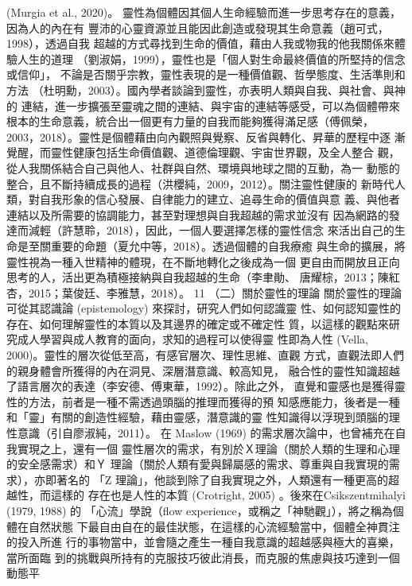 (Murgia et al., 2020)。 
靈性為個體因其個人生命經驗而進一步思考存在的意義，因為人的內在有
豐沛的心靈資源並且能因此創造或發現其生命意義（趙可式，1998），透過自我
超越的方式尋找到生命的價值，藉由人我或物我的他我關係來體驗人生的道理
（劉淑娟，1999），靈性也是「個人對生命最終價值的所堅持的信念或信仰」，
不論是否關乎宗教，靈性表現的是一種價值觀、哲學態度、生活準則和方法
（杜明勳，2003）。國內學者談論到靈性，亦表明人類與自我、與社會、與神的
連結，進一步擴張至靈魂之間的連結、與宇宙的連結等感受，可以為個體帶來
根本的生命意義，統合出一個更有力量的自我而能夠獲得滿足感（傅佩榮，
2003，2018）。靈性是個體藉由向內觀照與覺察、反省與轉化、昇華的歷程中逐
漸覺醒，而靈性健康包括生命價值觀、道德倫理觀、宇宙世界觀，及全人整合
觀，從人我關係結合自己與他人、社群與自然、環境與地球之間的互動，為一
動態的整合，且不斷持續成長的過程（洪櫻純，2009，2012）。關注靈性健康的
新時代人類，對自我形象的信心發展、自律能力的建立、追尋生命的價值與意
義、與他者連結以及所需要的協調能力，甚至對理想與自我超越的需求並沒有
因為網路的發達而減輕（許慧聆，2018），因此，一個人要選擇怎樣的靈性信念
來活出自己的生命是至關重要的命題（夏允中等，2018）。透過個體的自我療癒
與生命的擴展，將靈性視為一種入世精神的體現，在不斷地轉化之後成為一個
更自由而開放且正向思考的人，活出更為積極接納與自我超越的生命（李聿勛、
唐耀棕，2013；陳紅杏，2015；葉俊廷、李雅慧，2018）。 
11 
（二）關於靈性的理論 
關於靈性的理論可從其認識論 (epistemology) 來探討，研究人們如何認識靈
性、如何認知靈性的存在、如何理解靈性的本質以及其邊界的確定或不確定性
質，以這樣的觀點來研究成人學習與成人教育的面向，求知的過程可以使得靈
性即為人性 (Vella, 2000)。靈性的層次從低至高，有感官層次、理性思維、直觀
方式，直觀法即人們的親身體會所獲得的內在洞見、深層潛意識、較高知見，
融合性的靈性知識超越了語言層次的表達（李安德、傅東華，1992）。除此之外，
直覺和靈感也是獲得靈性的方法，前者是一種不需透過頭腦的推理而獲得的預
知感應能力，後者是一種和「靈」有關的創造性經驗，藉由靈感，潛意識的靈
性知識得以浮現到頭腦的理性意識（引自廖淑純，2011）。 
在 Maslow (1969) 的需求層次論中，也曾補充在自我實現之上，還有一個
靈性層次的需求，有別於Ｘ理論（關於人類的生理和心理的安全感需求）和Ｙ
理論（關於人類有愛與歸屬感的需求、尊重與自我實現的需求），亦即著名的
「Z 理論」，他談到除了自我實現之外，人類還有一種更高的超越性，而這樣的
存在也是人性的本質 (Crotright, 2005) 。後來在Csikszentmihalyi (1979, 1988) 的
「心流」學說（flow experience，或稱之「神馳觀」），將之稱為個體在自然狀態
下最自由自在的最佳狀態，在這樣的心流經驗當中，個體全神貫注的投入所進
行的事物當中，並會隨之產生一種自我意識的超越感與極大的喜樂，當所面臨
到的挑戰與所持有的克服技巧彼此消長，而克服的焦慮與技巧達到一個動態平
